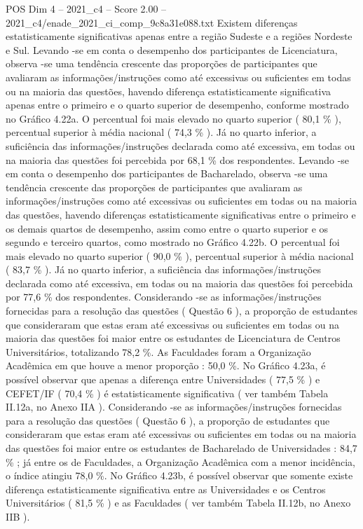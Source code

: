\begin{textsample}{POS Dim 4 – 2021\_c4 – Score 2.00 – 2021\_c4/enade\_2021\_ci\_comp\_9c8a31e088.txt}
Existem diferenças estatisticamente significativas apenas entre a região Sudeste e a regiões Nordeste e Sul.
Levando -se em conta o desempenho dos participantes de Licenciatura, observa -se uma tendência crescente das proporções de participantes que avaliaram as informações/instruções como até excessivas ou suficientes em todas ou na maioria das questões, havendo diferença estatisticamente significativa apenas entre o primeiro e o quarto superior de desempenho, conforme mostrado no Gráfico 4.22a.
O percentual foi mais elevado no quarto superior ( 80,1 \% ), percentual superior à média nacional ( 74,3 \% ).
Já no quarto inferior, a suficiência das informações/instruções declarada como até excessiva, em todas ou na maioria das questões foi percebida por 68,1 \% dos respondentes.
Levando -se em conta o desempenho dos participantes de Bacharelado, observa -se uma tendência crescente das proporções de participantes que avaliaram as informações/instruções como até excessivas ou suficientes em todas ou na maioria das questões, havendo diferenças estatisticamente significativas entre o primeiro e os demais quartos de desempenho, assim como entre o quarto superior e os segundo e terceiro quartos, como mostrado no Gráfico 4.22b.
O percentual foi mais elevado no quarto superior ( 90,0 \% ), percentual superior à média nacional ( 83,7 \% ).
Já no quarto inferior, a suficiência das informações/instruções declarada como até excessiva, em todas ou na maioria das questões foi percebida por 77,6 \% dos respondentes.
Considerando -se as informações/instruções fornecidas para a resolução das questões ( Questão 6 ), a proporção de estudantes que consideraram que estas eram até excessivas ou suficientes em todas ou na maioria das questões foi maior entre os estudantes de Licenciatura de Centros Universitários, totalizando 78,2 \%.
As Faculdades foram a Organização Acadêmica em que houve a menor proporção : 50,0 \%.
No Gráfico 4.23a, é possível observar que apenas a diferença entre Universidades ( 77,5 \% ) e CEFET/IF ( 70,4 \% ) é estatisticamente significativa ( ver também Tabela II.12a, no Anexo IIA ).
Considerando -se as informações/instruções fornecidas para a resolução das questões ( Questão 6 ), a proporção de estudantes que consideraram que estas eram até excessivas ou suficientes em todas ou na maioria das questões foi maior entre os estudantes de Bacharelado de Universidades : 84,7 \% ; já entre os de Faculdades, a Organização Acadêmica com a menor incidência, o índice atingiu 78,0 \%.
No Gráfico 4.23b, é possível observar que somente existe diferença estatisticamente significativa entre as Universidades e os Centros Universitários ( 81,5 \% ) e as Faculdades ( ver também Tabela II.12b, no Anexo IIB ).

\end{textsample}
